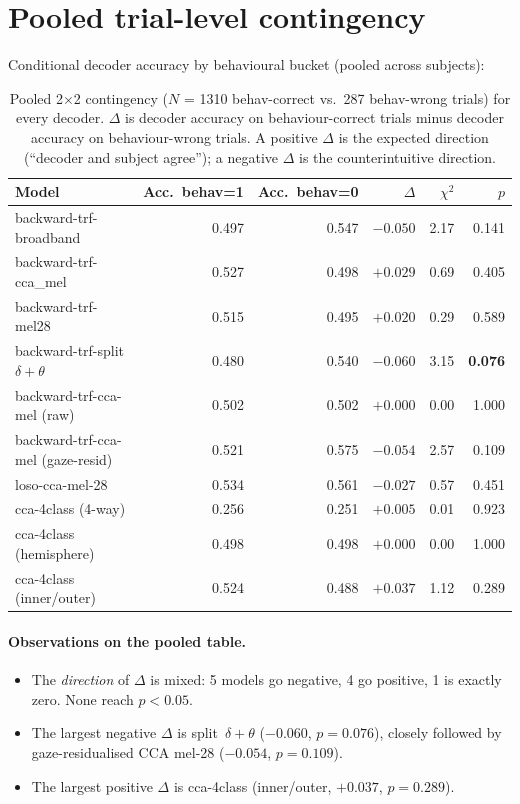 \section{Pooled trial-level contingency}

Conditional decoder accuracy by behavioural bucket (pooled across
subjects):

\begin{table}[ht]
\centering
\begin{tabular}{lrrrrr}
\toprule
Model & Acc.\ behav=1 & Acc.\ behav=0 & $\Delta$ & $\chi^2$ & $p$ \\
\midrule
backward-trf-broadband            & 0.497 & 0.547 & $-0.050$ & 2.17 & 0.141 \\
backward-trf-cca\_mel             & 0.527 & 0.498 & $+0.029$ & 0.69 & 0.405 \\
backward-trf-mel28                & 0.515 & 0.495 & $+0.020$ & 0.29 & 0.589 \\
backward-trf-split $\delta+\theta$ & 0.480 & 0.540 & $-0.060$ & 3.15 & \textbf{0.076} \\
backward-trf-cca-mel (raw)        & 0.502 & 0.502 & $+0.000$ & 0.00 & 1.000 \\
backward-trf-cca-mel (gaze-resid) & 0.521 & 0.575 & $-0.054$ & 2.57 & 0.109 \\
loso-cca-mel-28                   & 0.534 & 0.561 & $-0.027$ & 0.57 & 0.451 \\
cca-4class (4-way)                & 0.256 & 0.251 & $+0.005$ & 0.01 & 0.923 \\
cca-4class (hemisphere)           & 0.498 & 0.498 & $+0.000$ & 0.00 & 1.000 \\
cca-4class (inner/outer)          & 0.524 & 0.488 & $+0.037$ & 1.12 & 0.289 \\
\bottomrule
\end{tabular}
\caption{Pooled 2$\times$2 contingency ($N$ = 1310 behav-correct vs.\ 287
behav-wrong trials) for every decoder. $\Delta$ is decoder accuracy on
behaviour-correct trials minus decoder accuracy on behaviour-wrong
trials. A positive $\Delta$ is the expected direction (``decoder and
subject agree''); a negative $\Delta$ is the counterintuitive direction.}
\end{table}

\paragraph{Observations on the pooled table.}
\begin{itemize}
  \item The \emph{direction} of $\Delta$ is mixed: 5 models go negative,
        4 go positive, 1 is exactly zero. None reach $p < 0.05$.
  \item The largest negative $\Delta$ is split~$\delta+\theta$
        ($-0.060$, $p = 0.076$), closely followed by gaze-residualised
        CCA mel-28 ($-0.054$, $p = 0.109$).
  \item The largest positive $\Delta$ is cca-4class (inner/outer,
        $+0.037$, $p = 0.289$).
\end{itemize}

